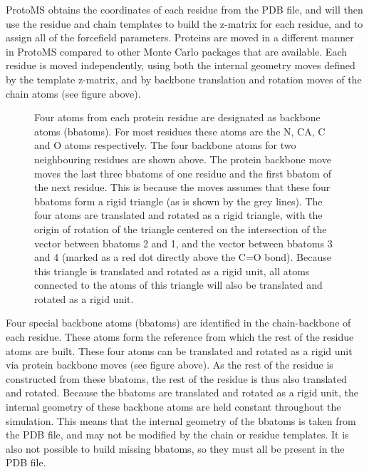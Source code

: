 \documentclass[letterpaper,10pt,english]{manual}
\begin{document}
ProtoMS obtains the coordinates of each residue from the PDB file, and will then use the residue and chain templates to build the z-matrix for each residue, and to assign all of the forcefield parameters.
\hypertarget{bbatoms}{}
Proteins are moved in a different manner in ProtoMS compared to other Monte Carlo packages that are available. Each residue is moved independently, using both the internal geometry moves defined by the template z-matrix, and by backbone translation and rotation moves of the chain atoms (see figure above).
\begin{figure}[htbp]
\centering

\caption{Four atoms from each protein residue are designated as backbone atoms (bbatoms). For most residues these atoms are the N, CA, C and O atoms respectively. The four backbone atoms for two neighbouring residues are shown above. The protein backbone move moves the last three bbatoms of one residue and the first bbatom of the next residue. This is because the moves assumes that these four bbatoms form a rigid triangle (as is shown by the grey lines). The four atoms are translated and rotated as a rigid triangle, with the origin of rotation of the triangle centered on the intersection of the vector between bbatoms 2 and 1, and the vector between bbatoms 3 and 4 (marked as a red dot directly above the C=O bond). Because this triangle is translated and rotated as a rigid unit, all atoms connected to the atoms of this triangle will also be translated and rotated as a rigid unit.}\end{figure}

Four special backbone atoms (bbatoms) are identified in the chain-backbone of each residue. These atoms form the reference from which the rest of the residue atoms are built. These four atoms can be translated and rotated as a rigid unit via protein backbone moves (see figure above). As the rest of the residue is constructed from these bbatoms, the rest of the residue is thus also translated and rotated. Because the bbatoms are translated and rotated as a rigid unit, the internal geometry of these backbone atoms are held constant throughout the simulation. This means that the internal geometry of the bbatoms is taken from the PDB file, and may not be modified by the chain or residue templates. It is also not possible to build missing bbatoms, so they must all be present in the PDB file.
\end{document}
